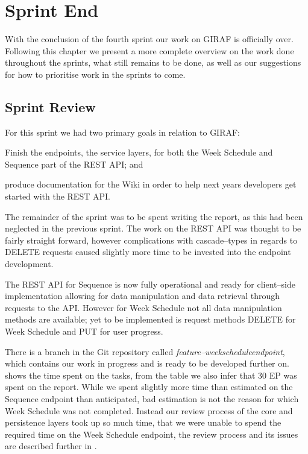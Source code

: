 \chapter{Sprint End}
With the conclusion of the fourth sprint our work on GIRAF is officially over.
Following this chapter we present a more complete overview on the work done throughout the sprints, what still remains to be done, as well as our suggestions for how to prioritise work in the sprints to come.

\section{Sprint Review}
For this sprint we had two primary goals in relation to GIRAF:
\begin{enumberate*}
\item Finish the endpoints, the service layers, for both the Week Schedule and Sequence part of the REST API; and
\item produce documentation for the Wiki in order to help next years developers get started with the REST API.
\end{enumberate*}
The remainder of the sprint was to be spent writing the report, as this had been neglected in the previous sprint. 
The work on the REST API was thought to be fairly straight forward, however complications with cascade--types in regards to DELETE requests caused slightly more time to be invested into the endpoint development.

The REST API for Sequence is now fully operational and ready for client--side implementation allowing for data manipulation and data retrieval through requests to the API.
However for  Week Schedule not all data manipulation methods are available; yet to be implemented is request methods DELETE for Week Schedule and PUT for user progress.

There is a branch in the Git repository called \textit{feature--weekscheduleendpoint}, which contains our work in progress and is ready to be developed further on.
 shows the time spent on the tasks, from the table we also infer that 30 EP was spent on the report.
While we spent slightly more time than estimated on the Sequence endpoint than anticipated, bad estimation is not the reason for which Week Schedule was not completed.
Instead our review process of the core and persistence layers took up so much time, that we were unable to spend the required time on the Week Schedule endpoint, the review process and its issues are described further in .


